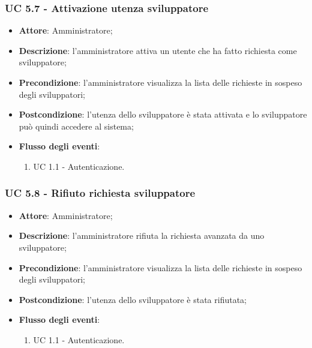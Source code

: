 \subsubsection{UC 5.7 - Attivazione utenza sviluppatore}
\begin{itemize}
\item \textbf{Attore}: Amministratore;
\item \textbf{Descrizione}: l'amministratore attiva un utente che ha fatto richiesta come sviluppatore;
\item \textbf{Precondizione}: l'amministratore visualizza la lista delle richieste in sospeso degli sviluppatori;
\item \textbf{Postcondizione}: l'utenza dello sviluppatore è stata attivata e lo sviluppatore può quindi accedere al sistema;
\item \textbf{Flusso degli eventi}: 
\begin{enumerate}
	\item UC 1.1 - Autenticazione.
\end{enumerate}
\end{itemize}

\subsubsection{UC 5.8 - Rifiuto richiesta sviluppatore}
\begin{itemize}
\item \textbf{Attore}: Amministratore;
\item \textbf{Descrizione}: l'amministratore rifiuta la richiesta avanzata da uno sviluppatore;
\item \textbf{Precondizione}: l'amministratore visualizza la lista delle richieste in sospeso degli sviluppatori;
\item \textbf{Postcondizione}: l'utenza dello sviluppatore è stata rifiutata;
\item \textbf{Flusso degli eventi}: 
\begin{enumerate}
	\item UC 1.1 - Autenticazione.
\end{enumerate}
\end{itemize}


